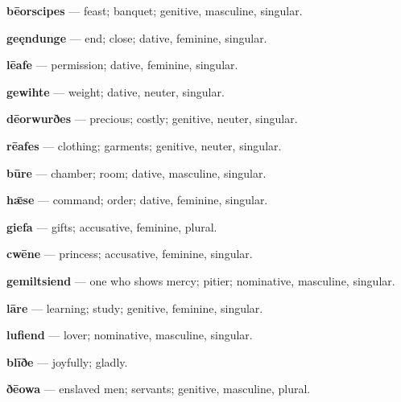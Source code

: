 \textbf{bēorscipes} — feast; banquet; genitive, masculine, singular.

\textbf{geęndunge} — end; close; dative, feminine, singular.

\textbf{lēafe} — permission; dative, feminine, singular.

\textbf{gewihte} — weight; dative, neuter, singular.

\textbf{dēorwurðes} — precious; costly; genitive, neuter, singular.

\textbf{rēafes} — clothing; garments; genitive, neuter, singular.

\textbf{būre} — chamber; room; dative, masculine, singular.

\textbf{hǣse} — command; order; dative, feminine, singular.

\textbf{giefa} — gifts; accusative, feminine, plural.

\textbf{cwēne} — princess; accusative, feminine, singular.

\textbf{gemiltsiend} — one who shows mercy; pitier; nominative, masculine, singular.

\textbf{lāre} — learning; study; genitive, feminine, singular.

\textbf{lufiend} — lover; nominative, masculine, singular.

\textbf{blīðe} — joyfully; gladly.

\textbf{ðēowa} — enslaved men; servants; genitive, masculine, plural.


